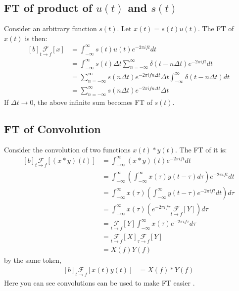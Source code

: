 \documentclass[letterpaper, 11pt]{article}
\newcommand{\fint}{\int_{-\infty}^{\infty}} %
\newcommand{\fsum}[1]{\sum_{#1 = -\infty}^{\infty}} %
\newcommand{\spf}[2]{\Delta #1 \fsum{#2} \delta (#1 - #2 \Delta #1)} %
\newcommand{\fourier}[3]{\underset{#1 \rightarrow #3}{\mathcal{F}}[#2]} %
\newcommand{\ft}[3]{\fint #2 e^{-2\pi i#3#1} d#1} %
\newcommand{\conv}[4]{\fint #3(#2)#4(#1 - #2) d#2} %
\numberwithin{equation}{section}
\numberwithin{figure}{section}
\numberwithin{table}{section}
\begin{document}
\subsection{FT of product of \(u(t)\) and \(s(t)\)}\label{sec:su}
Consider an arbitrary function \(s(t)\). Let \(x(t) = s(t)u(t)\). The FT of \(x(t)\) is then:
\begin{equation}
	\begin{aligned}[b]
		\fourier{t}{x}{f}
			&= \ft{t}{s(t)u(t)}{f}\\
			&= \ft{t}{s(t) \spf{t}{n}}{f}\\
			&= \fsum{n} s(n \Delta t) e^{-2\pi ifn\Delta t} \Delta t 
			   \fint \delta (t - n\Delta t) dt\\
			&= \fsum{n} s(n \Delta t) e^{-2\pi ifn\Delta t} \Delta t 
			\label{eq:ftsu}
	\end{aligned}
\end{equation}
If \(\Delta t \to 0\), the above infinite sum becomes FT of \(s(t)\). 

\subsection{FT of Convolution}
Consider the convolution of two functions \(x(t)*y(t)\). The FT of it is:
\begin{equation}
	\begin{aligned}[b]
		\fourier{t}{(x*y)(t)}{f}
			&= \ft{t}{(x*y)(t)}{f}\\
			&= \ft{t}{\left (\conv{t}{\tau}{x}{y} \right )}{f}\\ 
			&= \fint x(\tau) \left (\fint y(t - \tau) e^{-2\pi ift} dt \right ) d\tau\\
			&= \fint x(\tau) \left ( e^{-2\pi if\tau}\fourier{t}{Y}{f} \right )d\tau\\ 
			&= \fourier{t}{Y}{f} \ft{\tau}{x(\tau)}{f}\\
			&= \fourier{t}{X}{f} \fourier{\tau}{Y}{f}\\
			&= X(f)Y(f)
	\end{aligned}
\end{equation}
by the same token,
\begin{equation}
	\begin{aligned}[b]
		\fourier{t}{x(t)y(t)}{f}
			&= X(f)*Y(f)
			\label{eq:ftconv}
	\end{aligned}
\end{equation}
Here you can see convolutions can be used to make FT easier \cite{james}.
\end{document}

